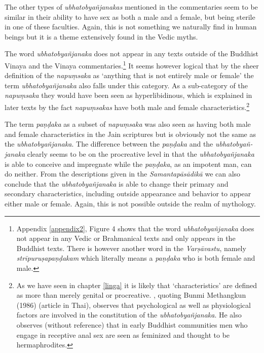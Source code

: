 The other types of {\em ubhatob­yañ­janakas} mentioned in the commentaries seem to be similar in their ability to have sex as both a male and a female, but being sterile in one of these faculties. Again, this is not something we naturally find in human beings but it is a theme extensively found in the Vedic myths.


The word {\em ubhatob­yañ­janaka} does not appear in any texts outside of the Buddhist Vinaya and the Vinaya commentaries.\footnote{Appendix \ref{appendix2}, Figure 4 shows that the word {\em ubhatob­yañ­janaka} does not appear in any Vedic or Brahmanical texts and only appears in the Buddhist texts. There is however another word in the {\em Varṣāvastu}, namely {\em strīpuruṣapaṇḍakam} which literally means a {\em paṇḍaka} who is both female and male.} It seems however logical that by the sheer definition of the {\em napuṃsaka} as `anything that is not entirely male or female' the term {\em ubhatob­yañ­janaka} also falls under this category. As a sub-category of the {\em napuṃsaka} they would have been seen as hyperlibidinous, which is explained in later texts by the fact {\em napuṃsakas} have both male and female characteristics.\footnote{As we have seen in chapter \ref{linga} it is likely that `characteristics' are defined as more than merely genital or procreative. \cite{jackson}, quoting Bunmi Methangkun (1986) (article in Thai), observes that psychological as well as physiological factors are involved in the constitution of the {\em ubhatob­yañ­janaka}. He also observes (without reference) that in early Buddhist communities men who engage in receptive anal sex are seen as feminized and thought to be hermaphrodites.} 

The term {\em paṇḍaka} as a subset of {\em napuṃsaka} was also seen as having both male and female characteristics in the Jain scriptures but is obviously not the same as the {\em ubhatob­yañ­janaka}. The difference between the {\em paṇḍaka} and the {\em ubhatob­yañ­janaka} clearly seems to be on the procreative level in that the {\em ubhatob­yañ­janaka} is able to conceive and impregnate while the {\em paṇḍaka}, as an impotent man, can do neither. From the descriptions given in the {\em Samantapāsādikā} we can also conclude that the {\em ubhatob­yañ­janaka} is able to change their primary and secondary characteristics, including outside appearance and behavior to appear either male or female. Again, this is not possible outside the realm of mythology.

